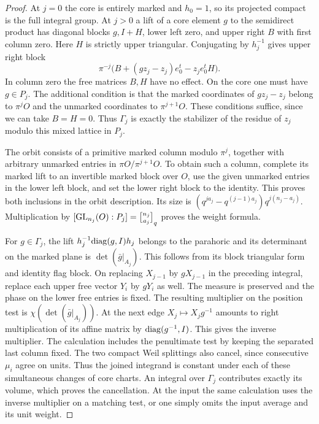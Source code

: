\documentclass[a4paper,11pt]{article}
\theoremstyle{definition}
\theoremstyle{remark}
\numberwithin{equation}{section}
\begin{document}
\begin{proof}
At \(j=0\) the core is entirely marked and \(h_0=1\), so
its projected compact is the full integral group. At \(j>0\)
a lift of a core element \(g\) to the semidirect product
has diagonal blocks \(g,I+H\), lower left zero, and upper
right \(B\) with first column zero. Here \(H\) is strictly
upper triangular. Conjugating by \(h_j^{-1}\) gives upper
right block
\[
  \pi^{-j}\bigl(B+(gz_j-z_j)e_0^t-z_j e_0^tH\bigr).
\]
In column zero the free matrices \(B,H\) have no effect.
On the core one must have \(g\in P_j\). The additional
condition is that the marked coordinates of \(gz_j-z_j\)
belong to \(\pi^jO\) and the unmarked coordinates to
\(\pi^{j+1}O\). These conditions suffice, since we can
take \(B=H=0\). Thus \(\Gamma_j\) is exactly the stabilizer
of the residue of \(z_j\) modulo this mixed lattice in \(P_j\).

The orbit consists of a primitive marked column modulo
\(\pi^j\), together with arbitrary unmarked entries in
\(\pi O/\pi^{j+1}O\). To obtain such a column, complete its
marked lift to an invertible marked block over \(O\), use
the given unmarked entries in the lower left block, and set
the lower right block to the identity. This proves both
inclusions in the orbit description. Its size is
\((q^{ja_j}-q^{(j-1)a_j})q^{j(n_j-a_j)}\). Multiplication
by \([{\rm GL}_{n_j}(O):P_j]={n_j\brack a_j}_q\) proves
the weight formula.

For \(g\in\Gamma_j\), the lift
\(h_j^{-1}{\rm diag}(g,I)h_j\) belongs to the parahoric
and its determinant on the marked plane is
\(\det(\bar g|_{A_j})\). This follows from its block
triangular form and identity flag block. On replacing
\(X_{j-1}\) by \(gX_{j-1}\) in the preceding integral,
replace each upper free vector \(Y_i\) by \(gY_i\) as
well. The measure is preserved and the phase on the lower
free entries is fixed. The resulting multiplier on the
position test is \(\chi(\det(\bar g|_{A_j}))\).
At the next edge \(X_j\mapsto X_jg^{-1}\) amounts to
right multiplication of its affine matrix by
\({\rm diag}(g^{-1},I)\). This gives the inverse multiplier.
The calculation includes the penultimate test by keeping
the separated last column fixed. The two compact Weil
splittings also cancel, since consecutive \(\mu_i\) agree
on units. Thus the joined integrand is constant under each
of these simultaneous changes of core charts. An integral
over \(\Gamma_j\) contributes exactly its volume, which
proves the cancellation. At the input the same calculation
uses the inverse multiplier on a matching test, or one
simply omits the input average and its unit weight.


\end{proof}
\end{document}
